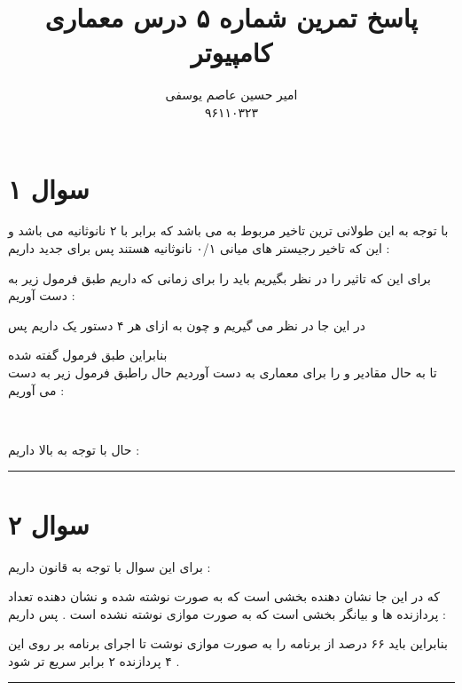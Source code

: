 \documentclass{article}
\title{پاسخ تمرین شماره ۵ درس معماری کامپیوتر }
\author{امیر حسین عاصم یوسفی \\ ۹۶۱۱۰۳۲۳}
\begin{document}
	\maketitle
	
\section*{سوال ۱}
با توجه به این طولانی ترین تاخیر مربوط به 
می باشد که برابر با ۲ نانوثانیه می باشد و این که تاخیر رجیستر های میانی ۰/۱ نانوثانیه هستند پس برای 
جدید داریم  : 
\begin{center}
\end{center}
برای این که تاثیر
را در نظر بگیریم باید 
را برای زمانی که 
داریم طبق فرمول زیر به دست آوریم : 
\begin{center}
\end{center}
در این جا 
در نظر می گیریم و چون به ازای هر ۴ دستور یک 
داریم پس 
\begin{center}
\end{center}
بنابراین طبق فرمول گفته شده 
\textcolor{red}{}\\
تا به حال مقادیر 
و 
را برای معماری 
به دست آوردیم حال  
راطبق فرمول زیر به دست می آوریم  : 
\begin{center}
 \\
\end{center}
حال با توجه به بالا داریم  : 
\begin{center}
\end{center}
\hrule
\section*{سوال ۲}
برای این سوال با توجه به قانون 
داریم  : 
\begin{center}
\end{center}
که در این جا 
نشان دهنده بخشی است که به صورت 
نوشته شده و 
نشان دهنده تعداد پردازنده ها و 
بیانگر بخشی است که به صورت موازی نوشته نشده است . پس داریم  : 
\begin{center}
\end{center}
بنابراین باید ۶۶ درصد از برنامه را به صورت موازی نوشت تا اجرای برنامه بر روی این ۴ پردازنده ۲ برابر سریع تر شود  . 
\hrule
\end{document}
